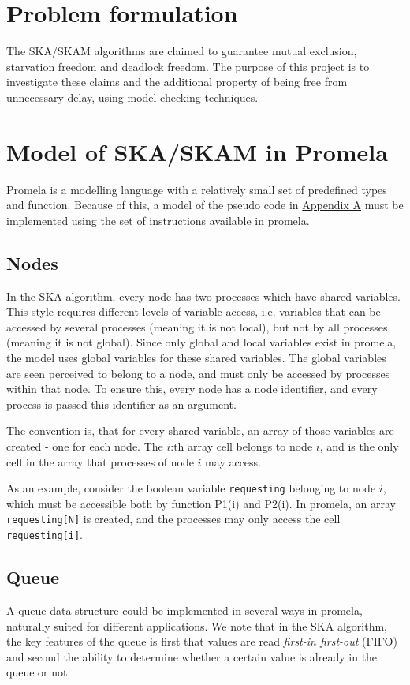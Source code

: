\documentclass[a4paper,12pt]{llncs}
\begin{document}
\section{Problem formulation}
The SKA/SKAM algorithms are claimed to guarantee mutual exclusion, starvation freedom and deadlock freedom. The purpose of this project is to investigate these claims and the additional property of being free from unnecessary delay, using model checking techniques. 

\section{Model of SKA/SKAM in Promela}
Promela is a modelling language with a relatively small set of predefined types and function. Because of this, a model of the pseudo code in \hyperref[sec:SKA]{Appendix A} must be implemented using the set of instructions available in promela.


\subsection{Nodes}
In the SKA algorithm, every node has two processes which have shared variables. This style requires different levels of variable access, i.e. variables that can be accessed by several processes (meaning it is not local), but not by all processes (meaning it is not global). Since only global and local variables exist in promela, the model uses global variables for these shared variables. The global variables are seen perceived to belong to a node, and must only be accessed by processes within that node. To ensure this, every node has a node identifier, and every process is passed this identifier as an argument. 

The convention is, that for every shared variable, an array of those variables are created - one for each node. The $i$:th array cell belongs to node $i$, and is the only cell in the array that processes of node $i$ may access.

As an example, consider the boolean variable \texttt{requesting} belonging to node $i$, which must be accessible both by function P1(i) and P2(i). In promela, an array \texttt{requesting[N]} is created, and the processes may only access the cell \texttt{requesting[i]}.

\subsection{Queue}
A queue data structure could be implemented in several ways in promela, naturally suited for different applications. We note that in the SKA algorithm, the key features of the queue is first that values are read \emph{first-in first-out} (FIFO) and second the ability to determine whether a certain value is already in the queue or not.
\end{document}
